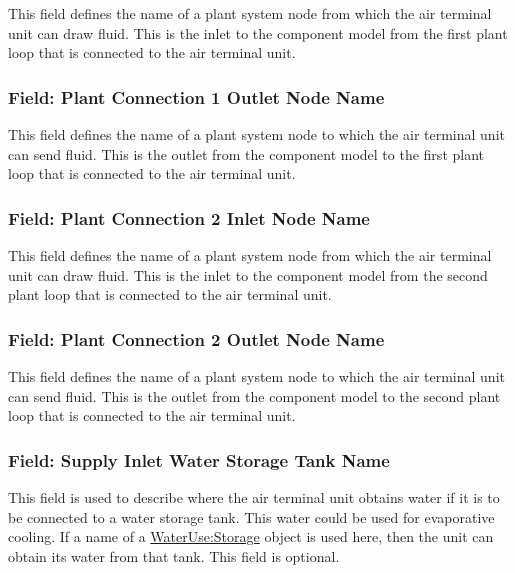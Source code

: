 This field defines the name of a plant system node from which the air terminal unit can draw fluid. This is the inlet to the component model from the first plant loop that is connected to the air terminal unit.

\subsubsection{Field: Plant Connection 1 Outlet Node Name}\label{field-plant-connection-1-outlet-node-name-1}

This field defines the name of a plant system node to which the air terminal unit can send fluid. This is the outlet from the component model to the first plant loop that is connected to the air terminal unit.

\subsubsection{Field: Plant Connection 2 Inlet Node Name}\label{field-plant-connection-2-inlet-node-name-1}

This field defines the name of a plant system node from which the air terminal unit can draw fluid. This is the inlet to the component model from the second plant loop that is connected to the air terminal unit.

\subsubsection{Field: Plant Connection 2 Outlet Node Name}\label{field-plant-connection-2-outlet-node-name-1}

This field defines the name of a plant system node to which the air terminal unit can send fluid. This is the outlet from the component model to the second plant loop that is connected to the air terminal unit.

\subsubsection{Field: Supply Inlet Water Storage Tank Name}\label{field-supply-inlet-water-storage-tank-name-1}

This field is used to describe where the air terminal unit obtains water if it is to be connected to a water storage tank. This water could be used for evaporative cooling. If a name of a \hyperref[waterusestorage]{WaterUse:Storage} object is used here, then the unit can obtain its water from that tank. This field is optional.

